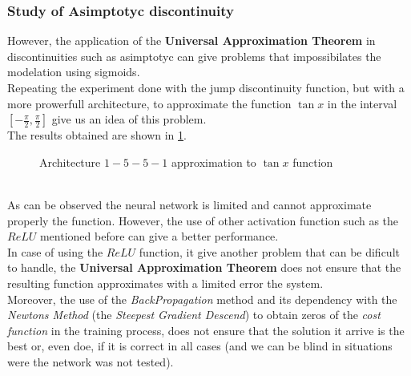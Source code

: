\documentclass[a4paper, 11pt]{article}
\begin{document}
\subsubsection{Study of Asimptotyc discontinuity}
However, the application of the \textbf{Universal Approximation Theorem} in discontinuities such as asimptotyc can give problems that impossibilates the modelation using sigmoids.\\
Repeating the experiment done with the jump discontinuity function, but with a more prowerfull architecture, to approximate the function $\tan{x}$ in the interval $[-\frac{\pi}{2},\frac{\pi}{2}]$ give us an idea of this problem.\\
The results obtained are shown in \ref{asymp}.
\begin{figure}[h]
    \centering
    \caption{Architecture $1-5-5-1$ approximation to $\tan{x}$ function}
    \label{asymp}
\end{figure}\\
As can be observed the neural network is limited and cannot approximate properly the function. However, the use of other activation function such as the $ReLU$ mentioned before can give a better performance.\\
In case of using the $ReLU$ function, it give another problem that can be dificult to handle, the \textbf{Universal Approximation Theorem} does not ensure that the resulting function approximates with a limited error the system.\\
Moreover, the use of the \textit{BackPropagation} method and its dependency with the \textit{Newtons Method} (the \textit{Steepest Gradient Descend}) to obtain zeros of the \textit{cost function} in the training process, does not ensure that the solution it arrive is the best or, even doe, if it is correct in all cases (and we can be blind in situations were the network was not tested).
\end{document}
